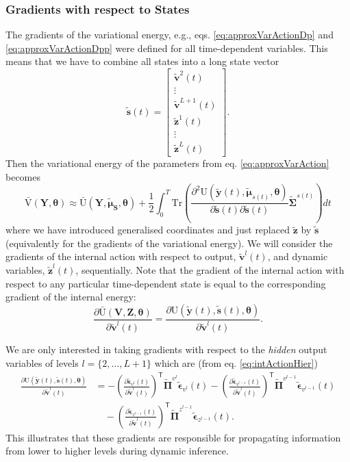 \documentclass[a4paper,10pt]{article}
\newcommand{\bs}[1]{\mathbf{#1}}					%
\newcommand{\bgs}[1]{\boldsymbol{#1}}				%
\newcommand{\pd}[2]{\frac{\partial #1}{\partial #2}} 	%
\newcommand{\ppd}[3]{\frac{\partial^2 #1}{\partial #2 \partial #3}} %
\newcommand{\tr}{\mathsf{T}}				%
\newcommand{\eq}[1]{\begin{equation} #1 \end{equation}}%
\newcommand{\trace}[1]{\mathrm{Tr}\left(#1\right)}					%
\newcommand{\gc}[1]{\tilde{#1}} %
\renewcommand{\ss}{z}         %
\newcommand{\sv}{v}         %
\newcommand{\so}{y}         %
\newcommand{\st}{s}         %
\newcommand{\spe}{\epsilon} %
\renewcommand{\sp}{\theta}    %
\newcommand{\ps}{\bs{\ss}}    %
\newcommand{\pv}{\bs{\sv}}    %
\newcommand{\po}{\bs{\so}}    %
\newcommand{\pt}{\bs{\st}}     %
\newcommand{\ppe}{\bgs{\spe}} %
\newcommand{\psg}{\gc{\ps}}    %
\newcommand{\pvg}{\gc{\pv}}    %
\newcommand{\ptg}{\gc{\pt}}     %
\newcommand{\pog}{\gc{\po}}    %
\newcommand{\ppeg}{\gc{\ppe}} %
\newcommand{\pp}{\bgs{\sp}} %
\newcommand{\Ps}{\bs{Z}}    %
\newcommand{\Po}{\bs{Y}}    %
\newcommand{\Pv}{\bs{V}}    %
\newcommand{\Pt}{\bs{S}}    %
\newcommand{\U}{\mathrm{U}}			%
\newcommand{\Ua}{\bar{\mathrm{U}}}		%
\newcommand{\Va}{\bar{\mathrm{V}}}		%
\newcommand{\Cov}{\bgs{\Sigma}}			%
\newcommand{\Prec}{\bgs{\Pi}}			%
\begin{document}
\subsubsection{Gradients with respect to States}
The gradients of the variational energy, e.g., eqs. \eqref{eq:approxVarActionDp} and \eqref{eq:approxVarActionDpp} were defined for all time-dependent variables. This means that we have to combine all states into a long state vector
\eq{
    \ptg(t) = \left[\begin{array}{c}
                     \pvg^2(t)\\
                     \vdots\\
                     \pvg^{L+1}(t)\\
                     \psg^1(t)\\
                     \vdots\\
                     \psg^L(t)
\end{array}\right].
}
Then the variational energy of the parameters from eq. \eqref{eq:approxVarAction} becomes
\eq{
    \Va(\Po,\pp) \approx \Ua(\Po,\gc{\bgs{\mu}}_\Pt,\pp) + \frac{1}{2}\int_0^T \trace{\ppd{\U(\pog(t),\gc{\bgs{\mu}}_{\st(t)},\pp)}{\ptg(t)}{\ptg(t)}\gc{\Cov}^{\st(t)}}dt
}
where we have introduced generalised coordinates and just replaced $\psg$ by $\ptg$ (equivalently for the gradients of the variational energy). We will consider the gradients of the internal action with respect to output, $\pvg^l(t)$, and dynamic variables, $\psg^l(t)$, sequentially. Note that the gradient of the internal action with respect to any particular time-dependent state is equal to the corresponding gradient of the internal energy:
\eq{
    \pd{\Ua(\Pv,\Ps,\pp)}{\pvg^l(t)} = \pd{\U(\pog(t),\ptg(t),\pp)}{\pvg^l(t)}.
}

We are only interested in taking gradients with respect to the \emph{hidden} output variables of levels $l=\{2, \dots, L+1\}$ which are (from eq. \ref{eq:intActionHier})
\begin{align}
    \pd{\U(\pog(t),\ptg(t),\pp)}{\pvg^l(t)} &=  - \left(\pd{\ppeg_{\sv^{l}}(t)}{\pvg^l(t)}\right)^\tr\gc{\Prec}^{\sv^{l}}\ppeg_{\sv^{l}}(t) - \left(\pd{\ppeg_{\sv^{l-1}}(t)}{\pvg^l(t)}\right)^\tr\gc{\Prec}^{\sv^{l-1}}\ppeg_{\sv^{l-1}}(t) \nonumber\\
    &\quad - \left(\pd{\ppeg_{\ss^{l-1}}(t)}{\pvg^l(t)}\right)^\tr\gc{\Prec}^{\ss^{l-1}}\ppeg_{\ss^{l-1}}(t).
\end{align}
This illustrates that these gradients are responsible for propagating information from lower to higher levels during dynamic inference. 
\end{document}

